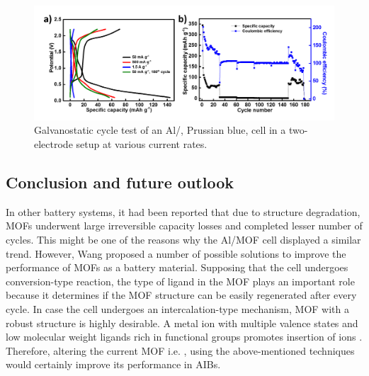  \begin{figure}[tbh!]
  \centering
  \includegraphics[width=\textwidth]{Figures/chap6fig/pbCDC2}
    \caption{Galvanostatic cycle test of an Al/, Prussian blue, cell in a two-electrode setup at various current rates.}
  \label{Figures/chap6fig:pbCDC2}
\end{figure}

\subsection{Conclusion and future outlook}
In other battery systems, it had been reported that due to structure degradation, MOFs underwent large irreversible capacity losses and completed lesser number of cycles. This might be one of the reasons why the Al/MOF cell displayed a similar trend. However, Wang  proposed a number of possible solutions to improve the performance of MOFs as a battery material. Supposing that the cell undergoes conversion-type reaction, the type of ligand in the MOF plays an important role because it determines if the MOF structure can be easily regenerated after every cycle. In case the cell undergoes an intercalation-type mechanism, MOF with a robust structure is highly desirable. A metal ion with multiple valence states and low molecular weight ligands rich in functional groups promotes insertion of  ions \cite{wang_metalorganic_2016}. Therefore, altering the current MOF i.e. , using the above-mentioned techniques would certainly improve its performance in AIBs. 

